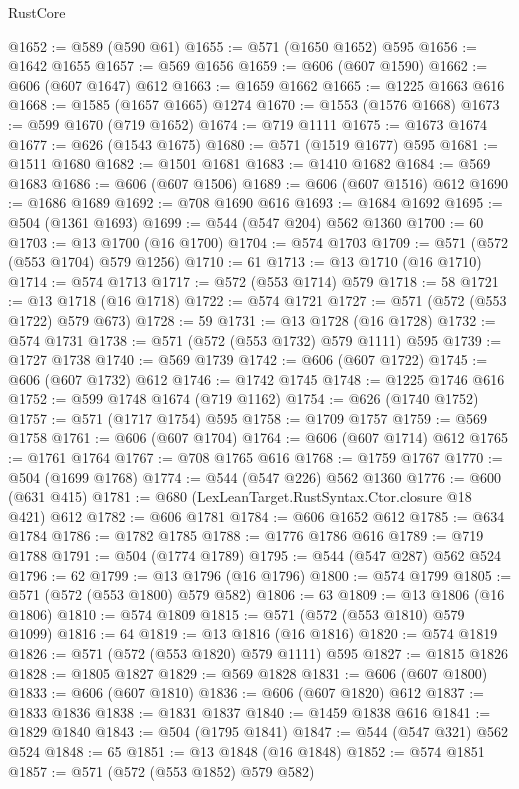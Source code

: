 \begin{lexlean}{RustCore}
\begin{coremodule}
@1652 := @589 (@590 @61)
@1655 := @571 (@1650 @1652) @595
@1656 := @1642 @1655
@1657 := @569 @1656
@1659 := @606 (@607 @1590)
@1662 := @606 (@607 @1647) @612
@1663 := @1659 @1662
@1665 := @1225 @1663 @616
@1668 := @1585 (@1657 @1665) @1274
@1670 := @1553 (@1576 @1668)
@1673 := @599 @1670 (@719 @1652)
@1674 := @719 @1111
@1675 := @1673 @1674
@1677 := @626 (@1543 @1675)
@1680 := @571 (@1519 @1677) @595
@1681 := @1511 @1680
@1682 := @1501 @1681
@1683 := @1410 @1682
@1684 := @569 @1683
@1686 := @606 (@607 @1506)
@1689 := @606 (@607 @1516) @612
@1690 := @1686 @1689
@1692 := @708 @1690 @616
@1693 := @1684 @1692
@1695 := @504 (@1361 @1693)
@1699 := @544 (@547 @204) @562 @1360
@1700 := 60
@1703 := @13 @1700 (@16 @1700)
@1704 := @574 @1703
@1709 := @571 (@572 (@553 @1704) @579 @1256)
@1710 := 61
@1713 := @13 @1710 (@16 @1710)
@1714 := @574 @1713
@1717 := @572 (@553 @1714) @579
@1718 := 58
@1721 := @13 @1718 (@16 @1718)
@1722 := @574 @1721
@1727 := @571 (@572 (@553 @1722) @579 @673)
@1728 := 59
@1731 := @13 @1728 (@16 @1728)
@1732 := @574 @1731
@1738 := @571 (@572 (@553 @1732) @579 @1111) @595
@1739 := @1727 @1738
@1740 := @569 @1739
@1742 := @606 (@607 @1722)
@1745 := @606 (@607 @1732) @612
@1746 := @1742 @1745
@1748 := @1225 @1746 @616
@1752 := @599 @1748 @1674 (@719 @1162)
@1754 := @626 (@1740 @1752)
@1757 := @571 (@1717 @1754) @595
@1758 := @1709 @1757
@1759 := @569 @1758
@1761 := @606 (@607 @1704)
@1764 := @606 (@607 @1714) @612
@1765 := @1761 @1764
@1767 := @708 @1765 @616
@1768 := @1759 @1767
@1770 := @504 (@1699 @1768)
@1774 := @544 (@547 @226) @562 @1360
@1776 := @600 (@631 @415)
@1781 := @680 (LexLeanTarget.RustSyntax.Ctor.closure @18 @421) @612
@1782 := @606 @1781
@1784 := @606 @1652 @612
@1785 := @634 @1784
@1786 := @1782 @1785
@1788 := @1776 @1786 @616
@1789 := @719 @1788
@1791 := @504 (@1774 @1789)
@1795 := @544 (@547 @287) @562 @524
@1796 := 62
@1799 := @13 @1796 (@16 @1796)
@1800 := @574 @1799
@1805 := @571 (@572 (@553 @1800) @579 @582)
@1806 := 63
@1809 := @13 @1806 (@16 @1806)
@1810 := @574 @1809
@1815 := @571 (@572 (@553 @1810) @579 @1099)
@1816 := 64
@1819 := @13 @1816 (@16 @1816)
@1820 := @574 @1819
@1826 := @571 (@572 (@553 @1820) @579 @1111) @595
@1827 := @1815 @1826
@1828 := @1805 @1827
@1829 := @569 @1828
@1831 := @606 (@607 @1800)
@1833 := @606 (@607 @1810)
@1836 := @606 (@607 @1820) @612
@1837 := @1833 @1836
@1838 := @1831 @1837
@1840 := @1459 @1838 @616
@1841 := @1829 @1840
@1843 := @504 (@1795 @1841)
@1847 := @544 (@547 @321) @562 @524
@1848 := 65
@1851 := @13 @1848 (@16 @1848)
@1852 := @574 @1851
@1857 := @571 (@572 (@553 @1852) @579 @582)

\end{coremodule}
\end{lexlean}

